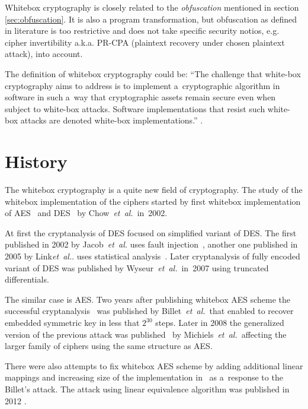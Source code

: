 \documentclass[11pt,oneside,final]{fithesis2}
\newcommand{\eal}{\emph{et~al.}}
\begin{document}
    Whitebox cryptography is closely related to the \emph{obfuscation} mentioned in section \ref{sec:obfuscation}. It is also a program transformation,
    but obfuscation as defined in literature is too restrictive and does not take specific security notios, e.g. cipher invertibility
    a.k.a. PR-CPA (plaintext recovery under chosen plaintext attack), into account. 
    
    The definition of whitebox cryptography could be:
    ``The challenge that white-box cryptography aims to address is to implement a~cryptographic algorithm in 
    software in such a~way that cryptographic assets remain secure even when subject to white-box attacks.
    Software implementations that resist such white-box attacks are denoted white-box implementations.'' \cite{hiding_keys}.
    
    \section{History}
    
    The whitebox cryptography is a quite new field of cryptography. The study of the whitebox implementation of the ciphers started by first 
    whitebox implementation of AES~\citep{Chow02white-boxcryptography} and DES~\citep{Chow02awhite-box} by Chow~\eal~in~2002. 
    
    At first the cryptanalysis of DES focused on simplified variant of DES. The first published in 2002 by Jacob~\eal
    uses fault injection~\citep{conf/ccs/JacobBF02}, another one published in 2005 by Link\eal. uses statistical analysis~\citep{Link:2005:COI:1058430.1059147}.
    Later cryptanalysis of fully encoded variant of DES was published by Wyseur~\eal~in~2007 using truncated differentials.
   
    The similar case is AES. Two years after publishing whitebox AES scheme the successful cryptanalysis~\citep{Billet:2004:CWB:2080787.2080809} was
    published by Billet~\eal~that enabled to recover embedded symmetric 
    key in less that $2^{30}$ steps. Later in 2008 the generalized version of the previous attack
    was published~\citep{Michiels:2007:MST:1314276.1314291} by Michiels~\eal~affecting the larger family of ciphers using the same structure as AES.   
   
    There were also attempts to fix whitebox AES scheme by adding additional linear mappings and increasing size of the implementation in~\citep{XiaoLai}
    as a~response to the Billet's attack.
    The attack using linear equivalence algorithm was published in 2012 \cite{conf/sacrypt/MulderRP12}.
    
\end{document}
